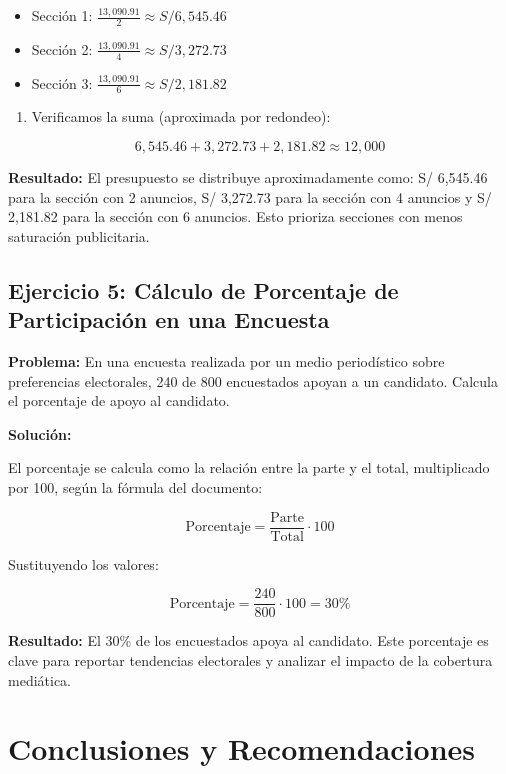 \documentclass[
  stu,
  floatsintext,
  longtable,
  a4paper,
  nolmodern,
  notxfonts,
  notimes,
  colorlinks=true,linkcolor=blue,citecolor=blue,urlcolor=blue]{apa7}
\providecommand{\tightlist}{%
  \setlength{\itemsep}{0pt}\setlength{\parskip}{0pt}}
\begin{document}
\begin{itemize}
\tightlist
\item
  Sección 1: \(\frac{13,090.91}{2} \approx S/ 6,545.46\)
\item
  Sección 2: \(\frac{13,090.91}{4} \approx S/ 3,272.73\)
\item
  Sección 3: \(\frac{13,090.91}{6} \approx S/ 2,181.82\)
\end{itemize}

\begin{enumerate}
\def\labelenumi{\arabic{enumi}.}
\setcounter{enumi}{3}
\tightlist
\item
  Verificamos la suma (aproximada por redondeo):
\end{enumerate}

\[
6,545.46 + 3,272.73 + 2,181.82 \approx 12,000
\]

\textbf{Resultado:} El presupuesto se distribuye aproximadamente como:
S/ 6,545.46 para la sección con 2 anuncios, S/ 3,272.73 para la sección
con 4 anuncios y S/ 2,181.82 para la sección con 6 anuncios. Esto
prioriza secciones con menos saturación publicitaria.

\subsection{Ejercicio 5: Cálculo de Porcentaje de Participación en una
Encuesta}\label{ejercicio-5-cuxe1lculo-de-porcentaje-de-participaciuxf3n-en-una-encuesta}

\textbf{Problema:} En una encuesta realizada por un medio periodístico
sobre preferencias electorales, 240 de 800 encuestados apoyan a un
candidato. Calcula el porcentaje de apoyo al candidato.

\textbf{Solución:}

El porcentaje se calcula como la relación entre la parte y el total,
multiplicado por 100, según la fórmula del documento:

\[
\text{Porcentaje} = \frac{\text{Parte}}{\text{Total}} \cdot 100
\]

Sustituyendo los valores:

\[
\text{Porcentaje} = \frac{240}{800} \cdot 100 = 30\%
\]

\textbf{Resultado:} El 30\% de los encuestados apoya al candidato. Este
porcentaje es clave para reportar tendencias electorales y analizar el
impacto de la cobertura mediática.

\section{Conclusiones y
Recomendaciones}\label{conclusiones-y-recomendaciones}
\end{document}
